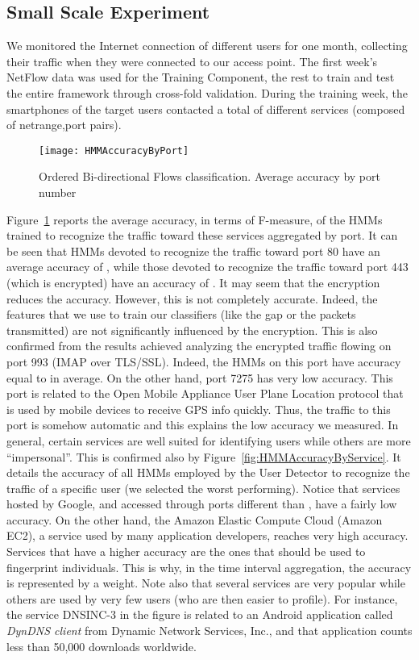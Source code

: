 \documentclass[10pt,conference,compsocconf,letterpaper]{IEEEtran}
\begin{document}
\subsection{Small Scale Experiment}
\label{sec:results}
We monitored the Internet connection of  different users for one month,
collecting their traffic when they were connected to our access
point. The first week's NetFlow data was used for the Training Component, the rest to train and test the entire framework through cross-fold validation. During the training week, the smartphones of the  target users contacted a total of  different services (composed of netrange,port pairs). 
\begin{figure}[t]	
    \centering    
    \texttt{[image: HMMAccuracyByPort]}
    \caption{Ordered Bi-directional Flows classification. Average accuracy by port number}
\label{fig:HMMAccuracyByPort}
\end{figure}
Figure~\ref{fig:HMMAccuracyByPort} reports the average accuracy, in terms of F-measure, of the HMMs trained to recognize the traffic toward these services aggregated by port.
It can be seen that HMMs devoted to recognize the traffic toward port 80 have an average accuracy of , while those devoted to recognize the traffic toward  port 443 (which is encrypted) have an accuracy of . 
It may seem that the encryption reduces the accuracy. However, this is not completely accurate. Indeed, the features that we use to train our classifiers (like the gap or the packets transmitted) are not significantly influenced by the encryption. This is also confirmed from the results achieved analyzing the encrypted traffic flowing on port 993 (IMAP over TLS/SSL). 
Indeed, the HMMs on this port have accuracy equal to  in average. 
On the other hand, port 7275 has very low accuracy. This port is related to the Open Mobile Appliance User Plane Location protocol that is used by mobile devices to receive GPS info quickly. Thus, the traffic to this port is somehow 
automatic and this explains the low accuracy we measured. 
In general, certain services are well suited for identifying users  while others are more ``impersonal''. This is confirmed also by Figure~\ref{fig:HMMAccuracyByService}. It details the accuracy of all HMMs employed by the User Detector to recognize the traffic of a specific user (we selected the worst performing). 
Notice that services hosted by Google, and accessed through ports different than , have a fairly low accuracy. On the other hand, the Amazon Elastic Compute Cloud (Amazon EC2), a service used by many application developers, reaches very high accuracy. 
Services that have a higher accuracy are the ones that should be used to fingerprint individuals. This is why, in the time interval aggregation, the accuracy is represented by a weight. 
Note also that several services are very popular while others are used by very few users (who are then easier to profile). For instance, the service DNSINC-3 in the figure is related to an Android application called \emph{DynDNS client} from Dynamic Network Services, Inc., and that application counts less than 50,000 downloads worldwide. 
\end{document}
